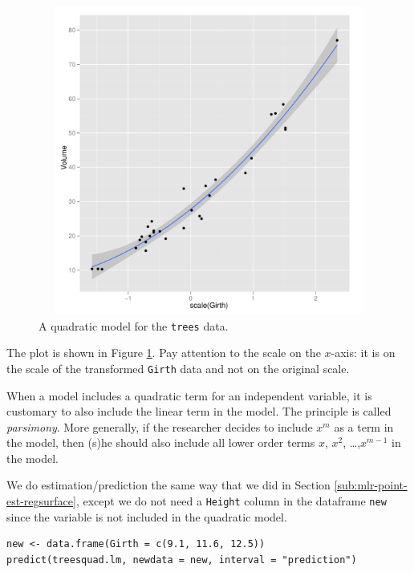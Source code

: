 \documentclass[captions=tableheading]{scrbook}
\begin{document}
\begin{example}
\begin{figure}[th]
    \includegraphics[width=5in, height=4in]{img/Fitting-the-Quadratic.pdf}
    \caption[Quadratic model for the \texttt{trees} data]{\small A quadratic model for the \texttt{trees} data.}
    \label{fig:Fitting-the-Quadratic}
  \end{figure}

The plot is shown in Figure \ref{fig:Fitting-the-Quadratic}. Pay attention to the scale on the \(x\)-axis: it is on the scale of the transformed \texttt{Girth} data and not on the original scale.

\end{example}


\begin{rem}
When a model includes a quadratic term for an independent variable, it is customary to also include the linear term in the model. The principle is called \emph{parsimony}. More generally, if the researcher decides to include \(x^{m}\) as a term in the model, then (s)he should also include all lower order terms \(x\), \(x^{2}\), \ldots{},\(x^{m-1}\) in the model.
\end{rem}

We do estimation/prediction the same way that we did in Section \ref{sub:mlr-point-est-regsurface}, except we do not need a \texttt{Height} column in the dataframe \texttt{new} since the variable is not included in the quadratic model.


\begin{verbatim}
new <- data.frame(Girth = c(9.1, 11.6, 12.5))
predict(treesquad.lm, newdata = new, interval = "prediction")
\end{verbatim}
\end{document}
